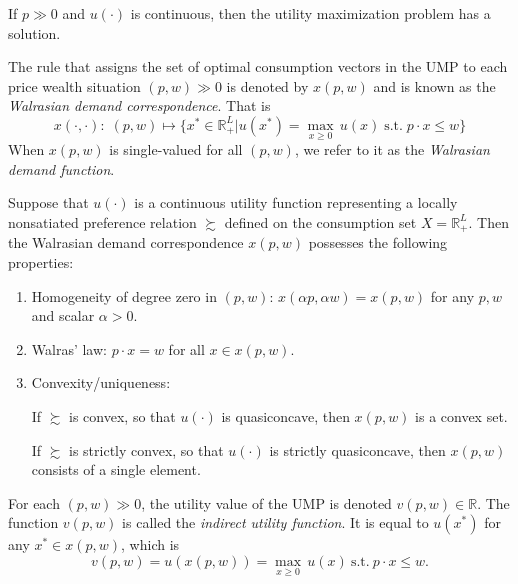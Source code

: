 \documentclass[12pt,fleqn]{book} %
\begin{document}
\begin{proposition}
	If $p\gg 0$ and $u(\cdot)$ is continuous, then the utility maximization problem has a solution.
\end{proposition}

\begin{definition}
	The rule that assigns the set of optimal consumption vectors in the UMP to each price wealth situation $(p, w)\gg 0$ is denoted by $x(p, w)$ and is known as the
	\emph{Walrasian demand correspondence}. That is
	\[
	x(\cdot,\cdot):\;(p,w)\mapsto \{x^*\in\mathbb{R}_+^L|u(x^*)=\max_{x\ge 0}\, u(x)\;\mathrm{s.t.}\; p\cdot x\le w\}
	\]	
	\noindent When $x(p, w)$ is single-valued for all $(p, w)$, we refer to it as the \emph{Walrasian demand function}.
	
\end{definition}


\begin{proposition}
	 Suppose that $u(\cdot)$ is a continuous utility function representing a locally nonsatiated preference relation $\succsim$ defined on the consumption set $X=\mathbb{R}_+^L$. Then the Walrasian demand correspondence $x(p, w)$ possesses the following
	 properties:
	 \begin{enumerate}
	 	\item Homogeneity of degree zero in $( p , w )$: $x(\alpha p, \alpha w) = x(p, w)$ for any $p, w$	and scalar $\alpha > 0$.
	 	\item Walras' law: $p\cdot x = w$ for all $x\in x(p,w)$.
	 	\item Convexity/uniqueness:
	 	
	 	 If $\succsim$ is convex, so that $u(\cdot)$ is quasiconcave, then $x(p, w)$ is a convex set. 
	 	 
	 	 If $\succsim$ is strictly convex, so that $u(\cdot)$ is strictly quasiconcave, then $x(p, w)$ consists of a single element.
	 \end{enumerate}
\end{proposition}

\begin{definition}
	For each $(p, w) \gg 0$, the utility value of the UMP is denoted $v(p, w)\in \mathbb{R}$. The function $v(p, w)$ is called the \emph{indirect utility function}. It is equal to $u(x^*)$ for any $x^*\in x(p, w)$, which is
	\[
	v(p, w)=u(x(p, w))=\max_{x\ge 0}\, u(x)\ \mathrm{s.t.}\  p\cdot x\le w.
	\]
	
\end{definition}
\end{document}
